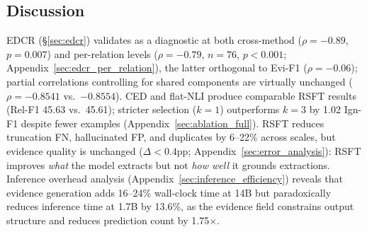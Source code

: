 \subsection{Discussion}
\label{sec:analysis}

EDCR (\S\ref{sec:edcr}) validates as a diagnostic at both cross-method ($\rho = -0.89$, $p = 0.007$) and per-relation levels ($\rho = -0.79$, $n = 76$, $p < 0.001$; Appendix~\ref{sec:edcr_per_relation}), the latter orthogonal to Evi-F1 ($\rho = -0.06$); partial correlations controlling for shared components are virtually unchanged ($\rho = -0.8541$ vs.\ $-0.8554$). CED and flat-NLI produce comparable RSFT results (Rel-F1 45.63 vs.\ 45.61); stricter selection ($k{=}1$) outperforms $k{=}3$ by 1.02 Ign-F1 despite fewer examples (Appendix~\ref{sec:ablation_full}). RSFT reduces truncation FN, hallucinated FP, and duplicates by 6--22\% across scales, but evidence quality is unchanged ($\Delta < 0.4$pp; Appendix~\ref{sec:error_analysis}): RSFT improves \emph{what} the model extracts but not \emph{how well} it grounds extractions. Inference overhead analysis (Appendix~\ref{sec:inference_efficiency}) reveals that evidence generation adds 16--24\% wall-clock time at 14B but paradoxically reduces inference time at 1.7B by 13.6\%, as the evidence field constrains output structure and reduces prediction count by 1.75$\times$.
